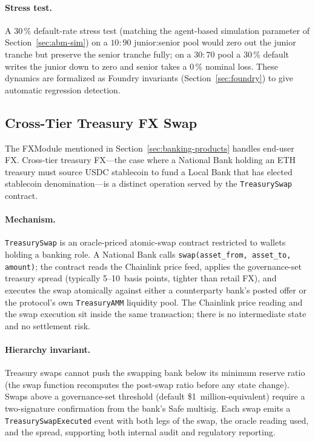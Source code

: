 \documentclass[12pt,a4paper]{report}
\begin{document}
\paragraph{Stress test.}
A 30\,\% default-rate stress test (matching the agent-based simulation parameter of Section~\ref{sec:abm-sim}) on a $10:90$ junior:senior pool would zero out the junior tranche but preserve the senior tranche fully; on a $30:70$ pool a 30\,\% default writes the junior down to zero and senior takes a 0\,\% nominal loss. These dynamics are formalized as Foundry invariants (Section~\ref{sec:foundry}) to give automatic regression detection.

\subsection{Cross-Tier Treasury FX Swap}
\label{sec:treasury-fx}

The FXModule mentioned in Section~\ref{sec:banking-products} handles end-user FX. Cross-tier treasury FX---the case where a National Bank holding an ETH treasury must source USDC stablecoin to fund a Local Bank that has elected stablecoin denomination---is a distinct operation served by the \texttt{TreasurySwap} contract.

\paragraph{Mechanism.}
\texttt{TreasurySwap} is an oracle-priced atomic-swap contract restricted to wallets holding a banking role. A National Bank calls \texttt{swap(asset\_from, asset\_to, amount)}; the contract reads the Chainlink price feed, applies the governance-set treasury spread (typically 5--10~basis points, tighter than retail FX), and executes the swap atomically against either a counterparty bank's posted offer or the protocol's own \texttt{TreasuryAMM} liquidity pool. The Chainlink price reading and the swap execution sit inside the same transaction; there is no intermediate state and no settlement risk.

\paragraph{Hierarchy invariant.}
Treasury swaps cannot push the swapping bank below its minimum reserve ratio (the swap function recomputes the post-swap ratio before any state change). Swaps above a governance-set threshold (default \$1~million-equivalent) require a two-signature confirmation from the bank's Safe multisig. Each swap emits a \texttt{TreasurySwapExecuted} event with both legs of the swap, the oracle reading used, and the spread, supporting both internal audit and regulatory reporting.
\end{document}
